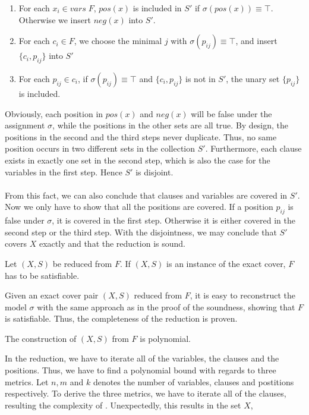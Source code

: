 \begin{enumerate}
    \item For each $x_i \in vars\; F$, $pos(x)$ is included in $S'$ if $\sigma(pos(x)) \equiv \top$. Otherwise we insert $neg(x)$ into $S'$.
    \item For each $c_i \in F$, we choose the minimal $j$ with $\sigma(p_{ij}) \equiv \top$, and insert $\{c_i, p_{ij}\}$ into $S'$
    \item For each $p_{ij} \in c_i$, if $\sigma(p_{ij}) \equiv \top$ and $\{c_i, p_{ij}\}$ is not in $S'$, the unary set $\{p_{ij}\}$ is included. 
\end{enumerate}
Obviously, each position in $pos(x)$ and $neg(x)$ will be false under the assignment $\sigma$, 
while the positions in the other sets are all true. By design, the positions in the second and the third steps never duplicate. 
Thus, no same position occurs in two different sets in the collection $S'$. 
Furthermore, each clause exists in exactly one set in the second step, which is also the case for the variables in the first step.
Hence $S'$ is disjoint. \\\\
From this fact, we can also conclude that clauses and variables are covered in $S'$. 
Now we only have to show that all the positions are covered. If a position $p_{ij}$ is false under $\sigma$, 
it is covered in the first step. Otherwise it is either covered in the second step or the third step. 
With the disjointness, we may conclude that $S'$ covers $X$ exactly and that the reduction is sound.
\begin{lemma}[Completeness]
    Let $(X, S)$ be reduced from $F$. If $(X, S)$ is an instance of the exact cover, $F$ has to be satisfiable.
\end{lemma}
Given an exact cover pair $(X, S)$ reduced from $F$, it is easy to reconstruct the model $\sigma$ with the same approach as in the proof of the soundness, 
showing that $F$ is satisfiable. Thus, the completeness of the reduction is proven. 
\begin{lemma}
    The construction of $(X, S)$ from $F$ is polynomial. 
\end{lemma}
In the reduction, we have to iterate all of the variables, the clauses and the positions. 
Thus, we have to find a polynomial bound with regards to three metrics. Let $n, m$ and $k$ denotes 
the number of variables, clauses and postitions respectively. To derive the three metrics, we have to iterate 
all of the clauses, resulting the complexity of . Unexpectedly, this results in the set $X$, 
